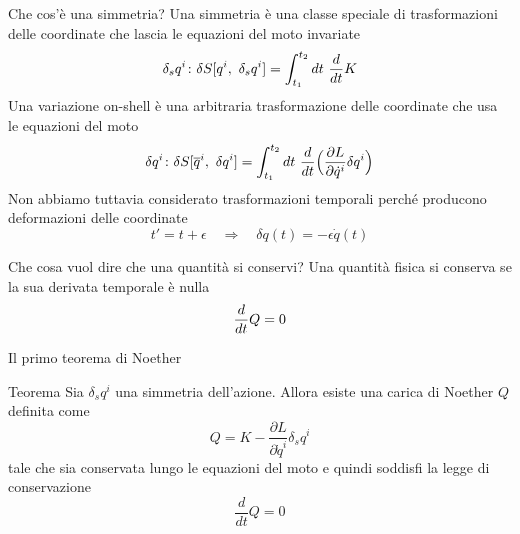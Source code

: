 \begin{frame}{Che cos'è una simmetria?}
    Una simmetria è una classe speciale di trasformazioni delle coordinate che lascia le equazioni del moto invariate
    \begin{equation*}
         \delta_s q^i \colon \delta S[q^i, ~\delta_s q^i] = \int_{t_1}^{t_2}dt~ \frac{d}{dt} K
    \end{equation*} 
    Una variazione on-shell è una arbitraria trasformazione delle coordinate che usa le equazioni del moto
    \begin{equation*}
        \delta q^i \colon \delta S[\overline q^i, ~\delta q^i] = \int_{t_1}^{t_2}dt~ \frac{d}{dt} \Big( \frac{\partial L}{\partial\dot q^i} \delta q^i \Big )
    \end{equation*} 
    Non abbiamo tuttavia considerato trasformazioni temporali perché producono deformazioni delle coordinate
    \begin{equation*}
        t' = t + \epsilon \quad \Rightarrow \quad \delta q(t) = - \epsilon \dot q(t)
    \end{equation*}
\end{frame}

\begin{frame}{Che cosa vuol dire che una quantità si conservi?}
    Una quantità fisica si conserva se la sua derivata temporale è nulla
    \begin{equation*}
        \frac{d}{dt} Q = 0
    \end{equation*}    
\end{frame}

\begin{frame}{Il primo teorema di Noether}
    \begin{block}{Teorema}
        Sia $\delta_s q^i$ una simmetria dell'azione. Allora esiste una carica di Noether $Q$ definita come
        \begin{equation*}
            Q = K - \frac{\partial L}{\partial \dot q^i} \delta_s q^i
        \end{equation*}
            tale che sia conservata lungo le equazioni del moto e quindi soddisfi la legge di conservazione
        \begin{equation*} 
            \frac{d}{dt} Q = 0
        \end{equation*}
    \end{block}
\end{frame}

